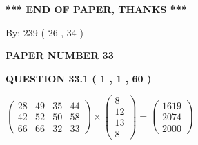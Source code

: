 \documentclass[12pt]{article}
\begin{document}
   
   
   
   
\vspace{1.0in} 
{\textbf{\large{ *** END OF PAPER, THANKS *** }}} 
   
   
\hspace{1.0in} By: 
         239 (          26 ,           34 )
   
   
   
   
\newpage 
\setcounter{page}{ 
    33001 } 
   
   
 {\textbf{ \Large{ PAPER NUMBER           33  }}}
   
   
   
   
  
  
{\textbf{\large{QUESTION
33.1 
 (           1 ,           1 ,          60 )
}}}

 
$\left( \begin{array}{ccccccccccccccc}
          28  & 
          49  & 
          35  & 
          44  \\ 
          42  & 
          52  & 
          50  & 
          58  \\ 
          66  & 
          66  & 
          32  & 
          33
\end{array}\right) \times
\left( \begin{array}{c}
           8  \\ 
          12  \\ 
          13  \\ 
           8
\end{array}\right)  =
\left( \begin{array}{c}
        1619  \\ 
        2074  \\ 
        2000
\end{array}\right)  $
 
\end{document}
